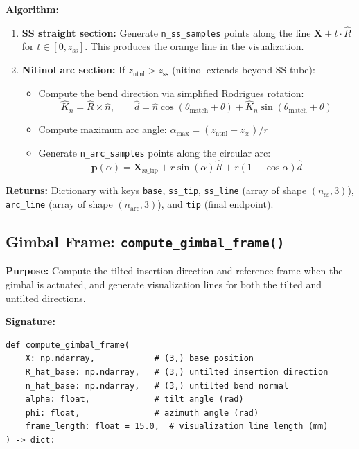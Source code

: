 \documentclass[11pt,a4paper]{article}
\newcommand{\funcname}[1]{\texttt{\textcolor{codepurple}{#1}}}
\newcommand{\param}[1]{\texttt{\textcolor{codegreen}{#1}}}
\begin{document}
\textbf{Algorithm:}
\begin{enumerate}[nosep]
    \item \textbf{SS straight section:} Generate \param{n\_ss\_samples} points along the line $\mathbf{X} + t \cdot \hat{R}$ for $t \in [0, z_\text{ss}]$. This produces the orange line in the visualization.

    \item \textbf{Nitinol arc section:} If $z_\text{ntnl} > z_\text{ss}$ (nitinol extends beyond SS tube):
    \begin{itemize}[nosep]
        \item Compute the bend direction via simplified Rodrigues rotation:
        \[
        \hat{K}_n = \hat{R} \times \hat{n}, \qquad \hat{d} = \hat{n} \cos(\theta_\text{match} + \theta) + \hat{K}_n \sin(\theta_\text{match} + \theta)
        \]
        \item Compute maximum arc angle: $\alpha_\text{max} = (z_\text{ntnl} - z_\text{ss}) / r$
        \item Generate \param{n\_arc\_samples} points along the circular arc:
        \[
        \mathbf{p}(\alpha) = \mathbf{X}_\text{ss\_tip} + r \sin(\alpha) \hat{R} + r(1 - \cos\alpha) \hat{d}
        \]
    \end{itemize}
\end{enumerate}

\textbf{Returns:} Dictionary with keys \texttt{base}, \texttt{ss\_tip}, \texttt{ss\_line} (array of shape $(n_\text{ss}, 3)$), \texttt{arc\_line} (array of shape $(n_\text{arc}, 3)$), and \texttt{tip} (final endpoint).

\subsection{Gimbal Frame: \funcname{compute\_gimbal\_frame()}}

\textbf{Purpose:} Compute the tilted insertion direction and reference frame when the gimbal is actuated, and generate visualization lines for both the tilted and untilted directions.

\textbf{Signature:}
\begin{lstlisting}
def compute_gimbal_frame(
    X: np.ndarray,            # (3,) base position
    R_hat_base: np.ndarray,   # (3,) untilted insertion direction
    n_hat_base: np.ndarray,   # (3,) untilted bend normal
    alpha: float,             # tilt angle (rad)
    phi: float,               # azimuth angle (rad)
    frame_length: float = 15.0,  # visualization line length (mm)
) -> dict:
\end{lstlisting}
\end{document}

